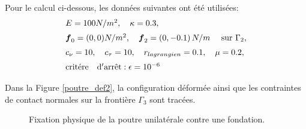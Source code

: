 Pour le calcul ci-dessous, les données suivantes ont été utilisées:
\begin{eqnarray*}
	\begin{array}{l}
		E= 100N/m^2,\quad \kappa=0.3,\nonumber \\[2mm]
		\mbox{\boldmath{$f$}}_0=(0,0) N/m^2, \quad \mbox{\boldmath{$f$}}_2= (0,-0.1)\, N/m    \quad \mbox{ sur } 
		\Gamma_2, \nonumber\\[2mm]
		c_\nu=10, \quad c_\tau=10,\quad r_{ lagrangien}=0.1,\quad \mu=0.2, \nonumber\\[2mm]
		{\rm crit\acute{e}re \quad d'arr\hat{e}t}: \epsilon=10^{-6}
	\end{array}
\end{eqnarray*}

Dans la Figure \ref{poutre_def2}, la configuration déformée ainsi que les contraintes de contact normales sur la frontière $\Gamma_3$ sont tracées.\\

\begin{figure}[ht!]
	\begin{center}
	\end{center}
	\caption{Fixation physique de la poutre unilatérale contre une fondation.}
	\label{poutre_conf2}
\end{figure}

